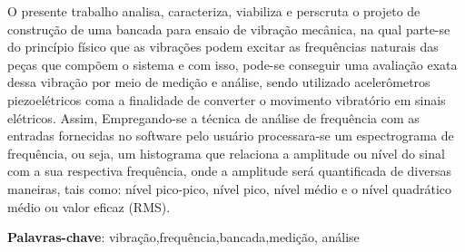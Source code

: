 \begin{resumo}
O presente trabalho analisa, caracteriza, viabiliza e perscruta  o projeto de construção de uma bancada para ensaio de vibração mecânica, na qual parte-se do princípio físico que as vibrações podem excitar as frequências naturais das peças que compõem o sistema e com isso, pode-se conseguir uma avaliação exata dessa vibração por meio de medição e análise, sendo utilizado acelerômetros piezoelétricos coma a finalidade de converter o movimento vibratório em sinais elétricos. Assim, Empregando-se a técnica de análise de frequência com as entradas fornecidas no software pelo usuário processara-se um espectrograma de frequência, ou seja, um histograma que relaciona a amplitude ou nível do sinal com a sua respectiva frequência, onde a amplitude será quantificada de diversas maneiras, tais como: nível pico-pico, nível pico, nível médio e o nível quadrático médio ou valor eficaz (RMS).
  


 \vspace{\onelineskip}
    
 \noindent
 \textbf{Palavras-chave}: vibração,frequência,bancada,medição, análise
 
\end{resumo}
